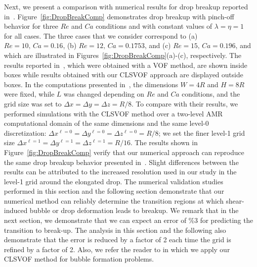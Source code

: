 \documentclass[%
 reprint,
 showkeys,
 amsmath,amssymb,
 aps,
 prfluids,
 onecolumn
]{revtex4-2}
\begin{document}
Next, we present a comparison with numerical results for drop breakup reported
in~\cite{RenCri01-2}.  Figure~\ref{fig:DropBreakComp} demonstrates drop breakup
with pinch-off behavior for three $Re$ and $Ca$ conditions and with constant
values of $\lambda = \eta = 1$ for all cases.  The three cases that we consider
correspond to (a) $Re = 10, \, Ca = 0.16$, (b) $Re = 12, \, Ca = 0.1753$, and
(c) $Re = 15, \, Ca = 0.196$, and which are illustrated in
Figures~\ref{fig:DropBreakComp}(a)-(c), respectively.  The results reported
in~\cite{RenCri01-2}, which were obtained with a VOF method, are shown inside
boxes while results obtained with our CLSVOF approach are displayed outside
boxes.  In the computations presented in~\cite{RenCri01-2}, the dimensions
$W=4R$ and $H=8R$ were fixed, while $L$ was changed depending on $Re$ and $Ca$
conditions, and the grid size was set to $\Delta x=\Delta y=\Delta z=R/8$.  To
compare with their results, we performed simulations with the CLSVOF method
over a two-level AMR computational domain of the same dimensions and the same
level-0 discretization: $\Delta x^{\ell=0} = \Delta y^{\ell=0} = \Delta
z^{\ell=0} = R/8$; we set the finer level-1 grid size $\Delta x^{\ell=1} =
\Delta y^{\ell=1} = \Delta z^{\ell=1} = R/16$.  The results shown in
Figure~\ref{fig:DropBreakComp} verify that our numerical approach can reproduce
the same drop breakup behavior presented in~\cite{RenCri01-2}.  Slight
differences between the results can be attributed to the increased resolution
used in our study in the level-1 grid around the elongated drop.  
{\color{red} The numerical
validation studies performed in this section and the following section
demonstrate that our numerical
method can reliably determine the transition regions at which shear-induced
bubble or drop deformation leads to breakup.  We remark that in the next
section, we demonstrate that we can expect an error of $\%3$ for predicting
the transition to break-up.  The analysis in this section and the
following also demonstrate that the error is reduced by a factor of 2 each
time the grid is refined by a factor of 2. Also, we refer the
reader to \cite{ohta2011robust} in which we apply our 
CLSVOF method for bubble formation
problems. }
\end{document}
